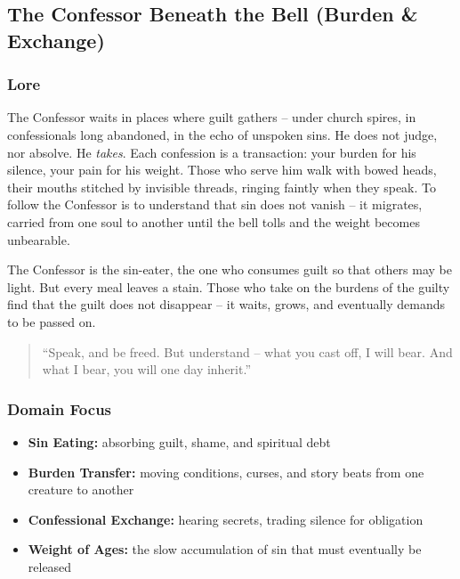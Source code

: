 
\subsection{The Confessor Beneath the Bell (Burden \& Exchange)}

\subsubsection*{Lore}
The Confessor waits in places where guilt gathers -- under church spires, in confessionals long abandoned, in the echo of unspoken sins. He does not judge, nor absolve. He \emph{takes}. Each confession is a transaction: your burden for his silence, your pain for his weight. Those who serve him walk with bowed heads, their mouths stitched by invisible threads, ringing faintly when they speak. To follow the Confessor is to understand that sin does not vanish -- it migrates, carried from one soul to another until the bell tolls and the weight becomes unbearable.

The Confessor is the sin-eater, the one who consumes guilt so that others may be light. But every meal leaves a stain. Those who take on the burdens of the guilty find that the guilt does not disappear -- it waits, grows, and eventually demands to be passed on.

\begin{quote}
``Speak, and be freed. But understand -- what you cast off, I will bear. And what I bear, you will one day inherit.''
\end{quote}

\subsubsection*{Domain Focus}
\begin{itemize}
  \item \textbf{Sin Eating:} absorbing guilt, shame, and spiritual debt
  \item \textbf{Burden Transfer:} moving conditions, curses, and story beats from one creature to another
  \item \textbf{Confessional Exchange:} hearing secrets, trading silence for obligation
  \item \textbf{Weight of Ages:} the slow accumulation of sin that must eventually be released
\end{itemize}

